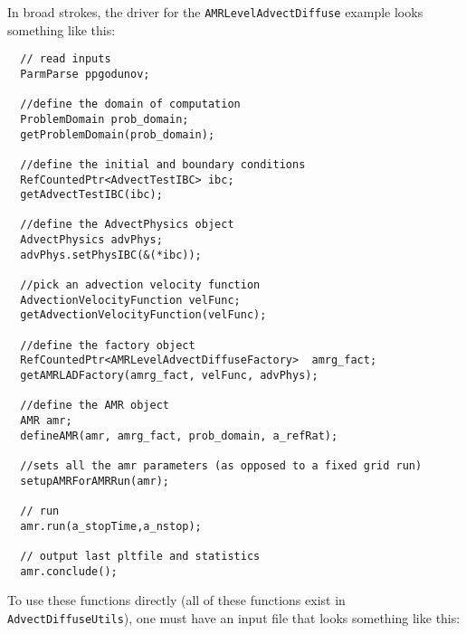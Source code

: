 In broad strokes, the driver for the \verb|AMRLevelAdvectDiffuse| example
looks something like this:
\begin{small}
\begin{verbatim}
  // read inputs
  ParmParse ppgodunov;

  //define the domain of computation
  ProblemDomain prob_domain;
  getProblemDomain(prob_domain);

  //define the initial and boundary conditions
  RefCountedPtr<AdvectTestIBC> ibc;
  getAdvectTestIBC(ibc);

  //define the AdvectPhysics object
  AdvectPhysics advPhys;
  advPhys.setPhysIBC(&(*ibc));

  //pick an advection velocity function
  AdvectionVelocityFunction velFunc;
  getAdvectionVelocityFunction(velFunc);

  //define the factory object
  RefCountedPtr<AMRLevelAdvectDiffuseFactory>  amrg_fact;
  getAMRLADFactory(amrg_fact, velFunc, advPhys);

  //define the AMR object
  AMR amr;
  defineAMR(amr, amrg_fact, prob_domain, a_refRat);
 
  //sets all the amr parameters (as opposed to a fixed grid run)
  setupAMRForAMRRun(amr);

  // run
  amr.run(a_stopTime,a_nstop);

  // output last pltfile and statistics
  amr.conclude();
\end{verbatim}
\end{small}
To use these functions  directly (all of these functions exist in
\verb|AdvectDiffuseUtils|), one must have an input file that looks something
like this:
